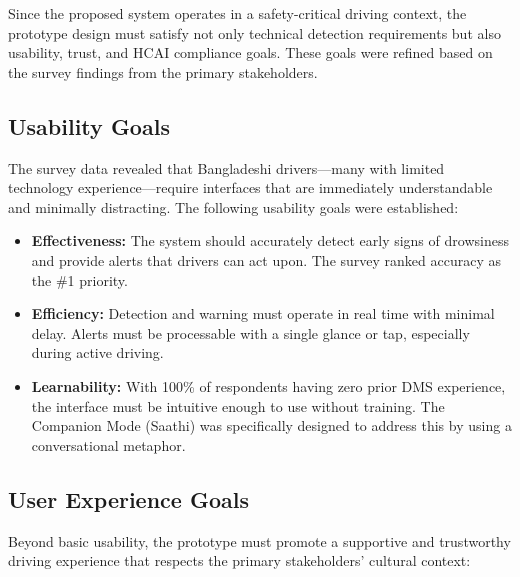 \documentclass[sigconf]{acmart}
\begin{document}
Since the proposed system operates in a safety-critical driving context, the prototype design must satisfy not only technical detection requirements but also usability, trust, and HCAI compliance goals. These goals were refined based on the survey findings from the primary stakeholders.

\subsection{Usability Goals}

The survey data revealed that Bangladeshi drivers---many with limited technology experience---require interfaces that are immediately understandable and minimally distracting. The following usability goals were established:

\begin{itemize}
    \item \textbf{Effectiveness:} The system should accurately detect early signs of drowsiness and provide alerts that drivers can act upon. The survey ranked accuracy as the \#1 priority.
    \item \textbf{Efficiency:} Detection and warning must operate in real time with minimal delay. Alerts must be processable with a single glance or tap, especially during active driving.
    \item \textbf{Learnability:} With 100\% of respondents having zero prior DMS experience, the interface must be intuitive enough to use without training. The Companion Mode (Saathi) was specifically designed to address this by using a conversational metaphor.
\end{itemize}

\subsection{User Experience Goals}

Beyond basic usability, the prototype must promote a supportive and trustworthy driving experience that respects the primary stakeholders' cultural context:
\end{document}

